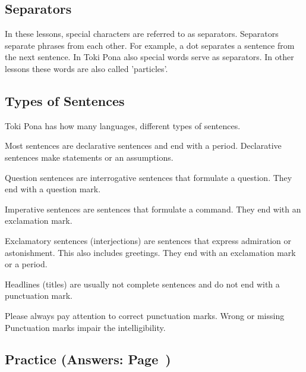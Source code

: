 %
\subsection*{Separators}
%
In these lessons, special characters are referred to as separators. 
Separators separate phrases from each other. 
For example, a dot separates a sentence from the next sentence. 
In Toki Pona also special words serve as separators. 
In other lessons these words are also called 'particles'.

%
\subsection*{Types of Sentences}
%
%
Toki Pona has how many languages, different types of sentences. 

Most sentences are declarative sentences and end with a period. 
Declarative sentences make statements or an assumptions. 

Question sentences are interrogative sentences that formulate a question. 
They end with a question mark. 

Imperative sentences are sentences that formulate a command. 
They end with an exclamation mark.

Exclamatory sentences (interjections) are sentences that express admiration or astonishment. 
This also includes greetings. 
They end with an exclamation mark or a period.

Headlines (titles) are usually not complete sentences and do not end with a punctuation mark.

Please always pay attention to correct punctuation marks. Wrong or missing
Punctuation marks impair the intelligibility.

%
\newpage
\subsection*{Practice (Answers: Page~\pageref{'pronunciation_alphabet'})}

